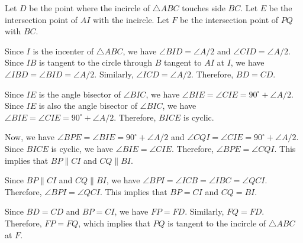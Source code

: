 Let $D$ be the point where the incircle of $\triangle ABC$ touches side $BC$. Let $E$ be the intersection point of $AI$ with the incircle. Let $F$ be the intersection point of $PQ$ with $BC$.

Since $I$ is the incenter of $\triangle ABC$, we have $\angle BID = \angle A/2$ and $\angle CID = \angle A/2$. Since $IB$ is tangent to the circle through $B$ tangent to $AI$ at $I$, we have $\angle IBD = \angle BID = \angle A/2$. Similarly, $\angle ICD = \angle A/2$. Therefore, $BD = CD$.

Since $IE$ is the angle bisector of $\angle BIC$, we have $\angle BIE = \angle CIE = 90^\circ + \angle A/2$. Since $IE$ is also the angle bisector of $\angle BIC$, we have $\angle BIE = \angle CIE = 90^\circ + \angle A/2$. Therefore, $BICE$ is cyclic.

Now, we have $\angle BPE = \angle BIE = 90^\circ + \angle A/2$ and $\angle CQI = \angle CIE = 90^\circ + \angle A/2$. Since $BICE$ is cyclic, we have $\angle BIE = \angle CIE$. Therefore, $\angle BPE = \angle CQI$. This implies that $BP \parallel CI$ and $CQ \parallel BI$.

Since $BP \parallel CI$ and $CQ \parallel BI$, we have $\angle BPI = \angle ICB = \angle IBC = \angle QCI$. Therefore, $\angle BPI = \angle QCI$. This implies that $BP = CI$ and $CQ = BI$.

Since $BD = CD$ and $BP = CI$, we have $FP = FD$. Similarly, $FQ = FD$. Therefore, $FP = FQ$, which implies that $PQ$ is tangent to the incircle of $\triangle ABC$ at $F$.
